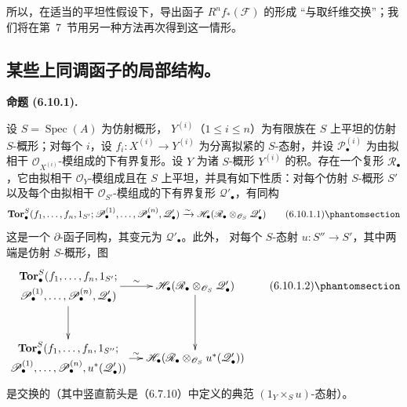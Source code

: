 \documentclass[UTF8,fontset=none,11pt,oneside,openany]{ctexbook}
\newenvironment{proposition}[1][]{%
  \par\medskip\noindent\textbf{命题 (#1).}\ %
}{\par}
\let\EGAOriginalLabel\label
\renewcommand{\label}[1]{\phantomsection\EGAOriginalLabel{#1}}
\begin{document}
所以，在适当的平坦性假设下，导出函子 $R^nf_*(\mathscr F)$ 的形成
“与取纤维交换”；我们将在第~7~节用另一种方法再次得到这一情形。

\subsection{某些上同调函子的局部结构。}

\begin{proposition}[6.10.1]
设 $S=\operatorname{Spec}(A)$ 为仿射概形，
$Y^{(i)}$（$1\leq i\leq n$）为有限族在 $S$ 上平坦的仿射
$S$-概形；对每个 $i$，设 $f_i:X^{(i)}\to Y^{(i)}$ 为分离拟紧的
$S$-态射，并设 $\mathscr P_\bullet^{(i)}$ 为由拟相干
$\mathscr O_{X^{(i)}}$-模组成的下有界复形。设 $Y$ 为诸 $S$-概形
$Y^{(i)}$ 的积。存在一个复形 $\mathscr R_\bullet$，它由拟相干
$\mathscr O_Y$-模组成且在 $S$ 上平坦，并具有如下性质：对每个仿射
$S$-概形 $S'$ 以及每个由拟相干 $\mathscr O_{S'}$-模组成的下有界复形
$\mathscr Q'_\bullet$，有同构
\[
  \mathbf{Tor}_\bullet^S
  (f_1,\ldots,f_n,1_{S'};
   \mathscr P_\bullet^{(1)},\ldots,\mathscr P_\bullet^{(n)},
   \mathscr Q'_\bullet)
  \xrightarrow{\sim}
  \mathscr H_\bullet
  (\mathscr R_\bullet\otimes_{\mathscr O_S}\mathscr Q'_\bullet)
  \tag{6.10.1.1}\label{III.6.10.1.1.fr}
\]
这是一个 $\partial$-函子同构，其变元为 $\mathscr Q'_\bullet$。此外，
对每个 $S$-态射 $u:S''\to S'$，其中两端是仿射 $S$-概形，图
\[
\xymatrix@C=12pt@R=30pt{
  {\begin{gathered}
    \mathbf{Tor}_\bullet^S
    (f_1,\ldots,f_n,1_{S'};\\
    \mathscr P_\bullet^{(1)},\ldots,\mathscr P_\bullet^{(n)},
    \mathscr Q'_\bullet)
  \end{gathered}}
  \ar[r]^-{\sim}\ar[d]
  &
  {\mathscr H_\bullet
    (\mathscr R_\bullet\otimes_{\mathscr O_S}\mathscr Q'_\bullet)}
  \ar[d]
  \\
  {\begin{gathered}
    \mathbf{Tor}_\bullet^S
    (f_1,\ldots,f_n,1_{S''};\\
    \mathscr P_\bullet^{(1)},\ldots,\mathscr P_\bullet^{(n)},
    u^*(\mathscr Q'_\bullet))
  \end{gathered}}
  \ar[r]^-{\sim}
  &
  {\mathscr H_\bullet
    (\mathscr R_\bullet\otimes_{\mathscr O_S}u^*(\mathscr Q'_\bullet))}
}
\tag{6.10.1.2}\label{III.6.10.1.2.fr}
\]
是交换的（其中竖直箭头是（6.7.10）中定义的典范
$(1_Y\times_Su)$-态射）。
\end{proposition}
\end{document}
